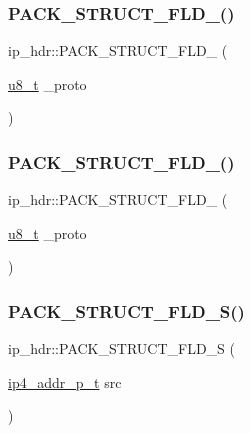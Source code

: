 \subsubsection{\texorpdfstring{P\+A\+C\+K\+\_\+\+S\+T\+R\+U\+C\+T\+\_\+\+F\+L\+D\+\_()}{PACK\_STRUCT\_FLD\_8()}\hspace{0.1cm}{\footnotesize\ttfamily [7/8]}}
{\footnotesize\ttfamily ip\+\_\+hdr\+::\+P\+A\+C\+K\+\_\+\+S\+T\+R\+U\+C\+T\+\_\+\+F\+L\+D\+\_ (\begin{DoxyParamCaption}\item[{\hyperlink{group__compiler__abstraction_ga4caecabca98b43919dd11be1c0d4cd8e}{u8\+\_\+t}}]{\+\_\+proto }\end{DoxyParamCaption})}

\mbox{\label{structip__hdr_a28e5be553013157549c28a6bfab2eb41}} 
\subsubsection{\texorpdfstring{P\+A\+C\+K\+\_\+\+S\+T\+R\+U\+C\+T\+\_\+\+F\+L\+D\+\_()}{PACK\_STRUCT\_FLD\_8()}\hspace{0.1cm}{\footnotesize\ttfamily [8/8]}}
{\footnotesize\ttfamily ip\+\_\+hdr\+::\+P\+A\+C\+K\+\_\+\+S\+T\+R\+U\+C\+T\+\_\+\+F\+L\+D\+\_ (\begin{DoxyParamCaption}\item[{\hyperlink{group__compiler__abstraction_ga4caecabca98b43919dd11be1c0d4cd8e}{u8\+\_\+t}}]{\+\_\+proto }\end{DoxyParamCaption})}

\mbox{\label{structip__hdr_a963b0932198484088775c5aa7446f0c1}} 
\subsubsection{\texorpdfstring{P\+A\+C\+K\+\_\+\+S\+T\+R\+U\+C\+T\+\_\+\+F\+L\+D\+\_\+\+S()}{PACK\_STRUCT\_FLD\_S()}\hspace{0.1cm}{\footnotesize\ttfamily [1/4]}}
{\footnotesize\ttfamily ip\+\_\+hdr\+::\+P\+A\+C\+K\+\_\+\+S\+T\+R\+U\+C\+T\+\_\+\+F\+L\+D\+\_\+S (\begin{DoxyParamCaption}\item[{\hyperlink{native_2lwip_2src_2include_2lwip_2prot_2ip4_8h_ae5011654fcbadf6b6582b8d49446107f}{ip4\+\_\+addr\+\_\+p\+\_\+t}}]{src }\end{DoxyParamCaption})}

